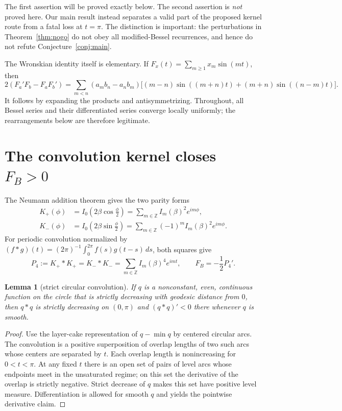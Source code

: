 \documentclass[11pt]{article}
\newtheorem{lemma}[theorem]{Lemma}
\theoremstyle{definition}
\theoremstyle{remark}
\newcommand{\FB}{F_{\!B}}
\begin{document}
The first assertion will be proved exactly below.  The second assertion is
\emph{not} proved here.  Our main result instead separates a valid part of
the proposed kernel route from a fatal loss at $t=\pi$.  The distinction is
important: the perturbations in Theorem~\ref{thm:nogo} do not obey all
modified-Bessel recurrences, and hence do not refute
Conjecture~\ref{conj:main}.

The Wronskian identity itself is elementary.  If
$F_x(t)=\sum_{m\ge1}x_m\sin(mt)$, then
\begin{equation}\label{eq:wronskian}
 2(F_a'F_b-F_aF_b')=
 \sum_{m<n}(a_mb_n-a_nb_m)
 \bigl[(m-n)\sin((m+n)t)+(m+n)\sin((n-m)t)\bigr].
\end{equation}
It follows by expanding the products and antisymmetrizing.  Throughout,
all Bessel series and their differentiated series converge locally
uniformly; the rearrangements below are therefore legitimate.

\section{The convolution kernel closes \texorpdfstring{$\FB>0$}{FB > 0}}

The Neumann addition theorem gives the two parity forms
\begin{align}
 K_+(\phi)&=I_0\!\left(2\beta\cos\frac{\phi}{2}\right)
   =\sum_{m\in\mathbb Z}I_m(\beta)^2e^{im\phi},\label{eq:kplus}\\
 K_-(\phi)&=I_0\!\left(2\beta\sin\frac{\phi}{2}\right)
   =\sum_{m\in\mathbb Z}(-1)^mI_m(\beta)^2e^{im\phi}.
   \label{eq:kminus}
\end{align}
For periodic convolution normalized by $(f*g)(t)=(2\pi)^{-1}
\int_0^{2\pi}f(s)g(t-s)\,ds$, both squares give
\begin{equation}\label{eq:p4}
 P_4:=K_+*K_+=K_-*K_-
 =\sum_{m\in\mathbb Z}I_m(\beta)^4e^{imt},
 \qquad \FB=-\frac12P_4'.
\end{equation}

\begin{lemma}[strict circular convolution]\label{lem:circle}
If $q$ is a nonconstant, even, continuous function on the circle that is
strictly decreasing with geodesic distance from $0$, then $q*q$ is strictly
decreasing on $(0,\pi)$ and $(q*q)'<0$ there whenever $q$ is smooth.
\end{lemma}

\begin{proof}
Use the layer-cake representation of $q-\min q$ by centered circular arcs.
The convolution is a positive superposition of overlap lengths of two such
arcs whose centers are separated by $t$.  Each overlap length is
nonincreasing for $0<t<\pi$.  At any fixed $t$ there is an open set of pairs
of level arcs whose endpoints meet in the unsaturated regime; on this set
the derivative of the overlap is strictly negative.  Strict decrease of
$q$ makes this set have positive level measure.  Differentiation is allowed
for smooth $q$ and yields the pointwise derivative claim.
\end{proof}
\end{document}
